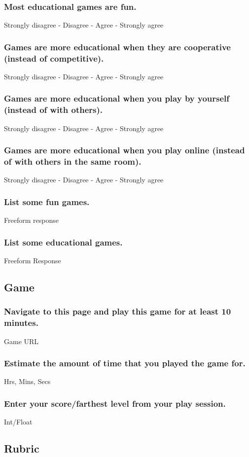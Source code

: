 		\subsubsection{Most educational games are fun.} Strongly disagree - Disagree - Agree - Strongly agree
		\subsubsection{Games are more educational when they are cooperative (instead of competitive).} Strongly disagree - Disagree - Agree - Strongly agree
		\subsubsection{Games are more educational when you play by yourself (instead of with others).} Strongly disagree - Disagree - Agree - Strongly agree
		\subsubsection{Games are more educational when you play online (instead of with others in the same room).} Strongly disagree - Disagree - Agree - Strongly agree
		\subsubsection{List some fun games.} Freeform response
		\subsubsection{List some educational games.} Freeform Response
	\subsection{Game}
		\subsubsection{Navigate to this page and play this game for at least 10 minutes.} Game URL
		\subsubsection{Estimate the amount of time that you played the game for.} Hrs, Mins, Secs
		\subsubsection{Enter your score/farthest level from your play session.} Int/Float 
	\subsection{Rubric}
	
